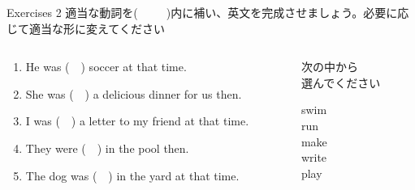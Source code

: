 \documentclass[aspectratio=169,xcolor={dvipsnames,table}]{beamer}
\begin{document}
\begin{frame}[plain]{Exercises 2}
適当な動詞を(~~~~~)内に補い、英文を完成させましょう。必要に応じて適当な形に変えてください

\begin{columns}[t]
\begin{column}{.75\textwidth}
 \begin{enumerate}
  \item He was (~~) soccer at that time.
  \item She was  (~~) a delicious dinner for us then.
  \item I was  (~~) a letter to my friend at that time.
  \item They were  (~~) in the pool then.
  \item The dog was  (~~) in the yard at that time. \\
\hfill{}\hfill\mbox{}
 \end{enumerate} 
\end{column} 
\begin{column}{.225\textwidth}
次の中から\\選んでください
 \begin{tcolorbox}
  swim\\
  run\\
  make\\
  write\\
  play
 \end{tcolorbox}
\end{column}
\end{columns}


\hfill{}

\end{frame}
\end{document}
